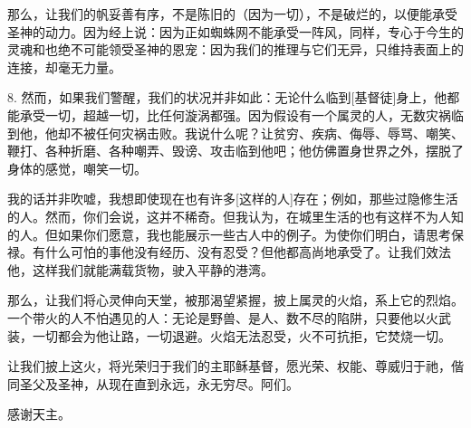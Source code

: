 那么，让我们的帆妥善有序，不是陈旧的（因为一切），不是破烂的，以便能承受圣神的动力。因为经上说：因为正如蜘蛛网不能承受一阵风，同样，专心于今生的灵魂和也绝不可能领受圣神的恩宠：因为我们的推理与它们无异，只维持表面上的连接，却毫无力量。\par

8. 然而，如果我们警醒，我们的状况并非如此：无论什么临到[基督徒]身上，他都能承受一切，超越一切，比任何漩涡都强。因为假设有一个属灵的人，无数灾祸临到他，他却不被任何灾祸击败。我说什么呢？让贫穷、疾病、侮辱、辱骂、嘲笑、鞭打、各种折磨、各种嘲弄、毁谤、攻击临到他吧；他仿佛置身世界之外，摆脱了身体的感觉，嘲笑一切。\par

我的话并非吹嘘，我想即使现在也有许多[这样的人]存在；例如，那些过隐修生活的人。然而，你们会说，这并不稀奇。但我认为，在城里生活的也有这样不为人知的人。但如果你们愿意，我也能展示一些古人中的例子。为使你们明白，请思考保禄。有什么可怕的事他没有经历、没有忍受？但他都高尚地承受了。让我们效法他，这样我们就能满载货物，驶入平静的港湾。\par

那么，让我们将心灵伸向天堂，被那渴望紧握，披上属灵的火焰，系上它的烈焰。一个带火的人不怕遇见的人：无论是野兽、是人、数不尽的陷阱，只要他以火武装，一切都会为他让路，一切退避。火焰无法忍受，火不可抗拒，它焚烧一切。\par

让我们披上这火，将光荣归于我们的主耶稣基督，愿光荣、权能、尊威归于祂，偕同圣父及圣神，从现在直到永远，永无穷尽。阿们。\par

感谢天主。\par

